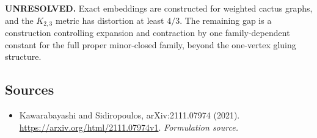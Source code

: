 \documentclass[11pt]{article}
\begin{document}
\textbf{UNRESOLVED.} Exact embeddings are constructed for weighted cactus graphs, and the $K_{2,3}$ metric has distortion at least $4/3$. The remaining gap is a construction controlling expansion and contraction by one family-dependent constant for the full proper minor-closed family, beyond the one-vertex gluing structure.

\subsection{Sources}
\begin{itemize}
\item[S1]Kawarabayashi and Sidiropoulos, arXiv:2111.07974 (2021).
\url{https://arxiv.org/html/2111.07974v1}.
\textit{Formulation source.}
\end{itemize}
\end{document}
